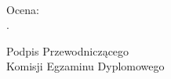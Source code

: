 \begin{titlepage}
\begin{center}
        ~\\[0.1cm]

        \begin{flushleft}
            \begin{minipage}{0.47\textwidth}
                \begin{flushleft} \normalsize
                    Ocena: \dotfill \\[0.7cm]
                    .\dotfill \\
                    \begin{center}
                        Podpis Przewodniczącego\\
                        Komisji Egzaminu Dyplomowego
                    \end{center}
                \end{flushleft}
            \end{minipage}
        \end{flushleft}

    \end{center}
\end{titlepage}
